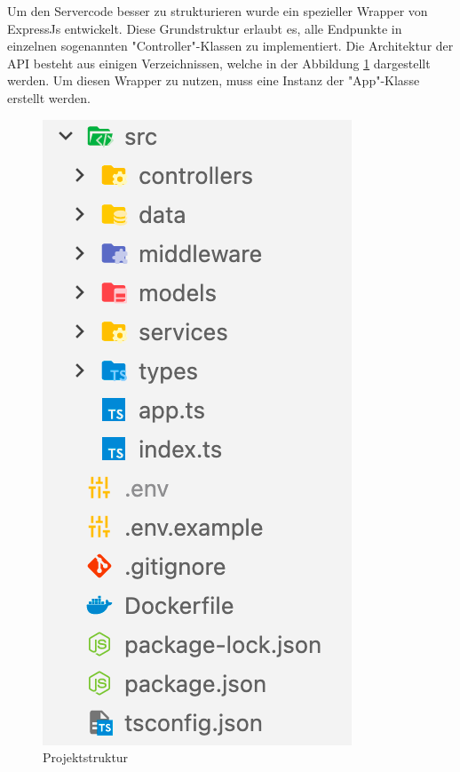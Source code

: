 
Um den Servercode besser zu strukturieren wurde ein spezieller Wrapper von ExpressJs entwickelt. Diese Grundstruktur erlaubt es, alle Endpunkte in einzelnen sogenannten "Controller"-Klassen zu implementiert. Die Architektur der API besteht aus einigen Verzeichnissen, welche in der Abbildung \ref{fig:apiStructure} dargestellt werden. Um diesen Wrapper zu nutzen, muss eine Instanz der "App"-Klasse erstellt werden.

\begin{figure}[H]
    \centering
    \includegraphics{media/APITemplate/ProjectStructure.png}
    \caption{Projektstruktur}
    \label{fig:apiStructure}
\end{figure}

\pagebreak









